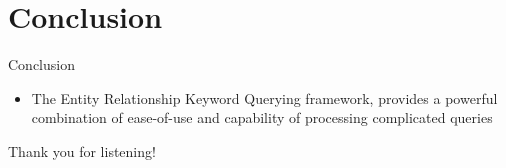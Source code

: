\documentclass[pdf,11pt]{beamer}
\begin{document}
\section{Conclusion}
\begin{frame}{Conclusion}
\begin{itemize}
\item<1-> The Entity Relationship Keyword Querying framework, provides a powerful combination of ease-of-use and capability of processing complicated queries

\end{itemize}
\end{frame}


\begin{frame}[plain,c]

\begin{center}
\Huge Thank you for listening!
\end{center}

\end{frame}
\end{document}
